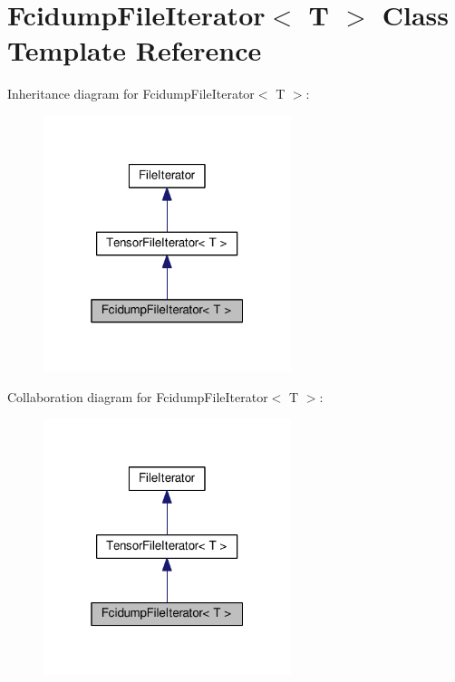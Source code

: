 \hypertarget{classFcidumpFileIterator}{}\section{Fcidump\+File\+Iterator$<$ T $>$ Class Template Reference}
\label{classFcidumpFileIterator}


Inheritance diagram for Fcidump\+File\+Iterator$<$ T $>$\+:\nopagebreak
\begin{figure}[H]
\begin{center}
\leavevmode
\includegraphics[width=205pt]{classFcidumpFileIterator__inherit__graph}
\end{center}
\end{figure}


Collaboration diagram for Fcidump\+File\+Iterator$<$ T $>$\+:\nopagebreak
\begin{figure}[H]
\begin{center}
\leavevmode
\includegraphics[width=205pt]{classFcidumpFileIterator__coll__graph}
\end{center}
\end{figure}
